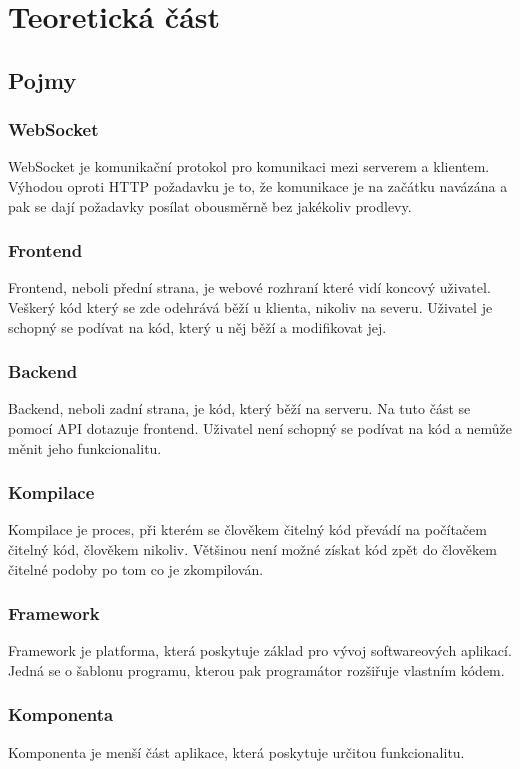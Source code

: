 \chapter{Teoretická část}

\section{Pojmy}

\subsection{WebSocket}
WebSocket je komunikační protokol pro komunikaci mezi serverem a klientem. Výhodou oproti HTTP požadavku je to, že komunikace je na začátku navázána a pak se dají požadavky posílat obousměrně bez jakékoliv prodlevy.

\subsection{Frontend}
Frontend, neboli přední strana, je webové rozhraní které vidí koncový uživatel. Veškerý kód který se zde odehrává běží u klienta, nikoliv na severu. Uživatel je schopný se podívat na kód, který u něj běží a modifikovat jej.

\subsection{Backend}
Backend, neboli zadní strana, je kód, který běží na serveru. Na tuto část se pomocí API dotazuje frontend. Uživatel není schopný se podívat na kód a nemůže měnit jeho funkcionalitu.

\subsection{Kompilace}
Kompilace je proces, při kterém se člověkem čitelný kód převádí na počítačem čitelný kód, člověkem nikoliv. Většinou není možné získat kód zpět do člověkem čitelné podoby po tom co je zkompilován.

\subsection{Framework}
Framework je platforma, která poskytuje základ pro vývoj softwareových aplikací. \cite{Framework} Jedná se o šablonu programu, kterou pak programátor rozšiřuje vlastním kódem.

\subsection{Komponenta}
Komponenta je menší část aplikace, která poskytuje určitou funkcionalitu.

